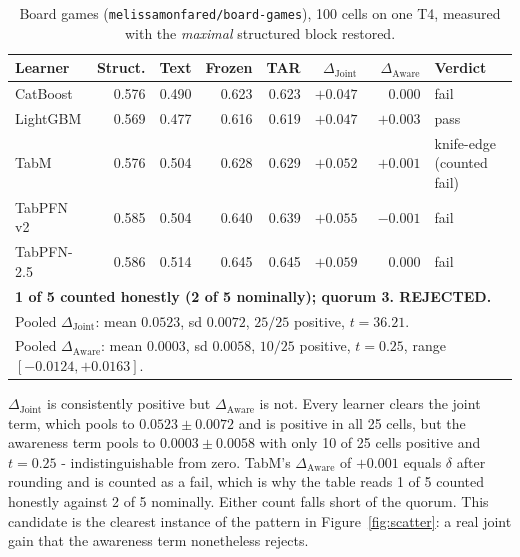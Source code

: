 \documentclass{article}
\newcommand{\djoint}{\Delta_{\text{Joint}}}
\newcommand{\daware}{\Delta_{\text{Aware}}}
\begin{document}
\begin{table}[H]
\centering\small
\caption{Board games (\texttt{melissamonfared/board-games}), 100 cells on one T4, measured
with the \emph{maximal} structured block restored.}
\begin{tabular}{lrrrrrrl}
\toprule
Learner & Struct. & Text & Frozen & TAR & $\djoint$ & $\daware$ & Verdict \\
\midrule
CatBoost   & 0.576 & 0.490 & 0.623 & 0.623 & $+0.047$ & $\phantom{-}0.000$ & fail \\
LightGBM   & 0.569 & 0.477 & 0.616 & 0.619 & $+0.047$ & $+0.003$ & pass \\
TabM       & 0.576 & 0.504 & 0.628 & 0.629 & $+0.052$ & $+0.001$ & knife-edge (counted fail) \\
TabPFN v2  & 0.585 & 0.504 & 0.640 & 0.639 & $+0.055$ & $-0.001$ & fail \\
TabPFN-2.5 & 0.586 & 0.514 & 0.645 & 0.645 & $+0.059$ & $\phantom{-}0.000$ & fail \\
\midrule
\multicolumn{8}{l}{\textbf{1 of 5 counted honestly (2 of 5 nominally); quorum 3. REJECTED.}} \\
\multicolumn{8}{l}{Pooled $\djoint$: mean $0.0523$, sd $0.0072$, $25/25$ positive, $t = 36.21$.} \\
\multicolumn{8}{l}{Pooled $\daware$: mean $0.0003$, sd $0.0058$, $10/25$ positive, $t = 0.25$, range $[-0.0124, +0.0163]$.} \\
\bottomrule
\end{tabular}
\end{table}

\noindent $\djoint$ is consistently positive but $\daware$ is not. Every learner clears the joint term, which pools to
$0.0523 \pm 0.0072$ and is positive in all 25 cells, but the awareness term pools to
$0.0003 \pm 0.0058$ with only 10 of 25 cells positive and $t = 0.25$ - indistinguishable
from zero. TabM's $\daware$ of $+0.001$ equals $\delta$ after rounding and is counted as a fail,
which is why the table reads 1 of 5 counted honestly against 2 of 5 nominally. Either count
falls short of the quorum. This candidate is the clearest instance of the pattern in
Figure~\ref{fig:scatter}: a real joint gain that the awareness term nonetheless rejects.
\end{document}
